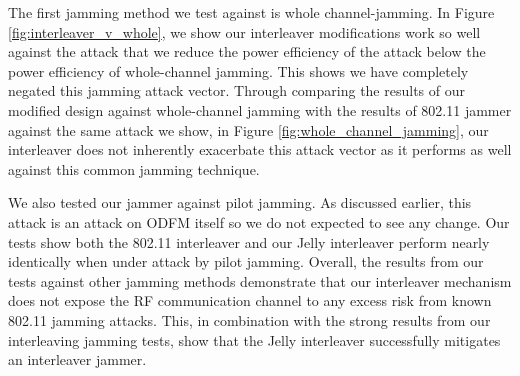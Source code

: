 \documentclass[sigconf, anonymous]{acmart}
\begin{document}
The first jamming method we test against is whole channel-jamming. In Figure \ref{fig:interleaver_v_whole}, we show our interleaver modifications work so well against the attack that we reduce the power efficiency of the attack below the power efficiency of whole-channel jamming. This shows we have completely negated this jamming attack vector. Through comparing the results of our modified design against whole-channel jamming with the results of 802.11 jammer against the same attack we show, in Figure \ref{fig:whole_channel_jamming}, our interleaver does not inherently exacerbate this attack vector as it performs as well against this common jamming technique. 

    
%    

We also tested our jammer against pilot jamming. As discussed earlier, this attack is an attack on ODFM itself so we do not expected to see any change. Our tests show both the 802.11 interleaver and our Jelly interleaver perform nearly identically when under attack by pilot jamming.  Overall, the results from our tests against other jamming methods demonstrate that our interleaver mechanism does not expose the RF communication channel to any excess risk from known 802.11 jamming attacks.  This, in combination with the strong results from our interleaving jamming tests, show that the Jelly interleaver successfully mitigates an interleaver jammer.
\end{document}
